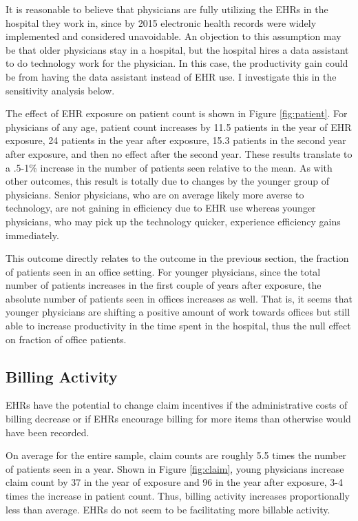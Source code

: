\documentclass[11pt]{article}
\begin{document}
It is reasonable to believe that physicians are fully utilizing the EHRs in the hospital they work in, since by 2015 electronic health records were widely implemented and considered unavoidable. An objection to this assumption may be that older physicians stay in a hospital, but the hospital hires a data assistant to do technology work for the physician. In this case, the productivity gain could be from having the data assistant instead of EHR use. I investigate this in the sensitivity analysis below.

The effect of EHR exposure on patient count is shown in Figure \ref{fig:patient}. For physicians of any age, patient count increases by 11.5 patients in the year of EHR exposure, 24 patients in the year after exposure, 15.3 patients in the second year after exposure, and then no effect after the second year. These results translate to a .5-1\% increase in the number of patients seen relative to the mean. As with other outcomes, this result is totally due to changes by the younger group of physicians. Senior physicians, who are on average likely more averse to technology, are not gaining in efficiency due to EHR use whereas younger physicians, who may pick up the technology quicker, experience efficiency gains immediately.

This outcome directly relates to the outcome in the previous section, the fraction of patients seen in an office setting. For younger physicians, since the total number of patients increases in the first couple of years after exposure, the absolute number of patients seen in offices increases as well. That is, it seems that younger physicians are shifting a positive amount of work towards offices but still able to increase productivity in the time spent in the hospital, thus the null effect on fraction of office patients. 


\subsection{Billing Activity}

EHRs have the potential to change claim incentives if the administrative costs of billing decrease or if EHRs encourage billing for more items than otherwise would have been recorded. 

On average for the entire sample, claim counts are roughly 5.5 times the number of patients seen in a year. Shown in Figure \ref{fig:claim}, young physicians increase claim count by 37 in the year of exposure and 96 in the year after exposure, 3-4 times the increase in patient count. Thus, billing activity increases proportionally less than average. EHRs do not seem to be facilitating more billable activity. 
\end{document}
